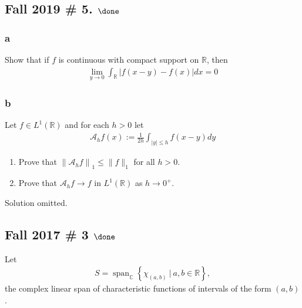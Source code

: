 \hypertarget{fall-2019-5.-done}{%
\subsection{\texorpdfstring{Fall 2019 \# 5.
\(\done\)}{Fall 2019 \# 5. \textbackslash done}}\label{fall-2019-5.-done}}

\hypertarget{a-9}{%
\subsubsection{a}\label{a-9}}

Show that if \(f\) is continuous with compact support on
\({\mathbb{R}}\), then
\begin{align*}
\lim _{y \rightarrow 0} \int_{\mathbb{R}}|f(x-y)-f(x)| d x=0
\end{align*}

\hypertarget{b-9}{%
\subsubsection{b}\label{b-9}}

Let \(f\in L^1({\mathbb{R}})\) and for each \(h > 0\) let
\begin{align*}
\mathcal{A}_{h} f(x):=\frac{1}{2 h} \int_{|y| \leq h} f(x-y) d y
\end{align*}

\begin{enumerate}
\def\labelenumi{\roman{enumi}.}
\item
  Prove that \(\left\|\mathcal{A}_{h} f\right\|_{1} \leq\|f\|_{1}\) for
  all \(h > 0\).
\item
  Prove that \(\mathcal{A}_h f \to f\) in \(L^1({\mathbb{R}})\) as
  \(h \to 0^+\).
\end{enumerate}


Solution omitted.

\hypertarget{fall-2017-3-done}{%
\subsection{\texorpdfstring{Fall 2017 \# 3
\(\done\)}{Fall 2017 \# 3 \textbackslash done}}\label{fall-2017-3-done}}

Let
\begin{align*}
S = {\operatorname{span}}_{\mathbb{C}}\left\{{\chi_{(a, b)} {~\mathrel{\Big|}~}a, b \in {\mathbb{R}}}\right\},
\end{align*}
the complex linear span of characteristic functions of intervals of the
form \((a, b)\).

